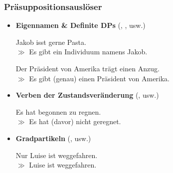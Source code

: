 
\begin{frame}
\frametitle{Präsuppositionsauslöser}

\begin{itemize}
	\item \textbf{Eigennamen \& Definite DPs} (\zB {}, , usw.)
	
	\ea Jakob isst gerne Pasta. \\ $\gg$ Es gibt ein Individuum namens Jakob.
	\z
	
	\ea Der Präsident von Amerika trägt einen Anzug.\\ $\gg$ Es gibt (genau) einen Präsident von Amerika.
	\z
	

%	
	
	\item \textbf{Verben der Zustandsveränderung} (\zB {}, usw.)

	\ea Es hat begonnen zu regnen.\\
			$\gg$ Es hat (davor) nicht geregnet.
	\z
	
	\item \textbf{Gradpartikeln} (\zB {}, usw.)
	
	\ea Nur Luise ist weggefahren. \\
			$\gg$ Luise ist weggefahren.
	\z		

\end{itemize}

\end{frame}



